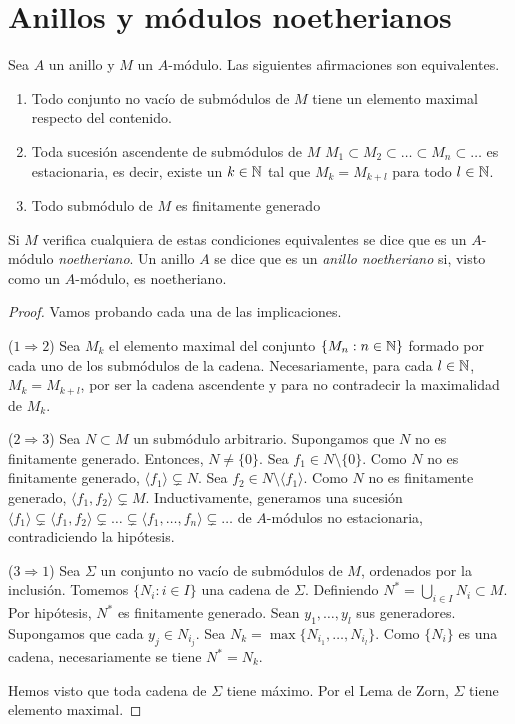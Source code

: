 \documentclass[../main.tex]{subfiles}
\begin{document}
\section{Anillos y módulos noetherianos}
\begin{proposition}
Sea $A$ un anillo y $M$ un $A$-módulo. Las siguientes afirmaciones son equivalentes.\begin{enumerate}
    \item Todo conjunto no vacío de submódulos de $M$ tiene un elemento maximal respecto del contenido.
    \item Toda sucesión ascendente de submódulos de $M$ $M_1\subset M_2\subset\dots\subset M_n\subset\dots$ es estacionaria, es decir, existe un $k\in\mathbb{N}$ tal que $M_k=M_{k+l}$ para todo $l\in\mathbb{N}$.
    \item Todo submódulo de $M$ es finitamente generado
\end{enumerate}
Si $M$ verifica cualquiera de estas condiciones equivalentes se dice que es un $A$-módulo \textit{noetheriano}. Un anillo $A$ se dice que es un \textit{anillo noetheriano} si, visto como un $A$-módulo, es noetheriano.
\end{proposition}
\begin{proof} Vamos probando cada una de las implicaciones.

($1\Rightarrow 2$) Sea $M_k$ el elemento maximal del conjunto $\{M_n:n\in\mathbb{N}\}$ formado por cada uno de los submódulos de la cadena. Necesariamente, para cada $l\in\mathbb{N}$, $M_k=M_{k+l}$, por ser la cadena ascendente y para no contradecir la maximalidad de $M_k$.

($2\Rightarrow 3$) Sea $N\subset M$ un submódulo arbitrario. Supongamos que $N$ no es finitamente generado. Entonces, $N\neq\{0\}$. Sea $f_1\in N\setminus\{0\}$. Como $N$ no es finitamente generado, $\langle f_1\rangle\varsubsetneq N$. Sea $f_2\in N\setminus\langle f_1\rangle$. Como $N$ no es finitamente generado, $\langle f_1,f_2\rangle\varsubsetneq M$. Inductivamente, generamos una sucesión $\langle f_1\rangle\varsubsetneq\langle f_1,f_2\rangle\varsubsetneq\dots\varsubsetneq\langle f_1,\dots,f_n\rangle\varsubsetneq\dots$ de $A$-módulos no estacionaria, contradiciendo la hipótesis.

($3\Rightarrow 1$) Sea $\Sigma$ un conjunto no vacío de submódulos de $M$, ordenados por la inclusión. Tomemos $\{N_i:i\in I\}$ una cadena de $\Sigma$. Definiendo $N^{\ast}=\bigcup_{i\in I}N_i\subset M$. Por hipótesis, $N^{\ast}$ es finitamente generado. Sean $y_1,\dots,y_l$ sus generadores. Supongamos que cada $y_j\in N_{i_j}$. Sea $N_k=\operatorname{max}\{N_{i_1},\dots,N_{i_l}\}$. Como $\{N_i\}$ es una cadena, necesariamente se tiene $N^{\ast}=N_k$.

Hemos visto que toda cadena de $\Sigma$ tiene máximo. Por el Lema de Zorn, $\Sigma$ tiene elemento maximal.
\end{proof}
\end{document}
